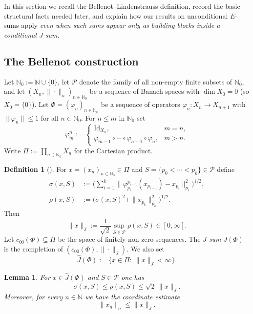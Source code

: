 \documentclass[reqno]{amsart}
\theoremstyle{plain}
\newtheorem{lemma}[theorem]{Lemma}
\theoremstyle{definition}
\newtheorem{definition}[theorem]{Definition}
\theoremstyle{remark}
\newcommand{\N}{\mathbb{N}}
\renewcommand{\le}{\leqslant}
\begin{document}
In this section we recall the Bellenot--Lindenstrauss definition, record the
basic structural facts needed later, and explain how our results on unconditional
$E$-sums apply \emph{even when such sums appear only as building blocks inside a
conditional $J$-sum}.  

\subsection{The Bellenot construction}\label{subsec:Jsum-def}

Let $\N_0:=\N\cup\{0\}$, let $\mathcal{P}$ denote the family of all non-empty
finite subsets of $\N_0$, and let $(X_n,\|\cdot\|_n)_{n\in\N_0}$ be a sequence of
Banach spaces with $\dim X_0=0$ (so $X_0=\{0\}$).
Let $\Phi=(\varphi_n)_{n\in\N_0}$ be a sequence of operators
$\varphi_n\colon X_n\to X_{n+1}$ with $\|\varphi_n\|\le 1$ for all $n\in\N_0$.
For $n\le m$ in $\N_0$ set
\[
\varphi_m^n :=
\begin{cases}
\mathrm{Id}_{X_n}, & m=n,\\
\varphi_{m-1}\circ\cdots\circ \varphi_{n+1}\circ \varphi_n, & m>n.
\end{cases}
\]
Write $\Pi:=\prod_{n\in\N_0} X_n$ for the Cartesian product.

\begin{definition}[{\cite[Def.\ 2.1]{Bellenot1982}}]\label{def:J-norm}
For $x=(x_n)_{n\in\N_0}\in\Pi$ and $S=\{p_0<\cdots<p_k\}\in\mathcal{P}$ define
\begin{align}
\sigma(x,S)
 &:= \Big( \sum_{i=1}^k \big\|\varphi_{p_i}^{p_{i-1}}(x_{p_{i-1}})-x_{p_i}\big\|_{p_i}^2 \Big)^{1/2},\label{eq:sigma}\\
\rho(x,S)
 &:= \Big( \sigma(x,S)^2 + \|x_{p_k}\|_{p_k}^2 \Big)^{1/2}.\label{eq:rho}
\end{align}
Then
\begin{equation}\label{eq:Jnorm}
\|x\|_{J}:=\frac{1}{\sqrt{2}}\sup_{S\in\mathcal{P}} \rho(x,S)\in[0,\infty].
\end{equation}
Let $c_{00}(\Phi)\subseteq\Pi$ be the space of finitely non-zero sequences.
The \emph{$J$-sum} $J(\Phi)$ is the completion of $(c_{00}(\Phi),\|\cdot\|_{J})$.
We also set
\[
\widehat{J}(\Phi):=\{x\in\Pi:\ \|x\|_{J}<\infty\}.
\]
\end{definition}

\begin{lemma}\label{lem:J-elementary}
For $x\in \widehat{J}(\Phi)$ and $S\in\mathcal{P}$ one has
\[
\sigma(x,S)\le \rho(x,S)\le \sqrt{2}\,\|x\|_{J}.
\]
Moreover, for every $n\in\N$ we have the coordinate estimate
\begin{equation}\label{eq:coord-contract}
\|x_n\|_n \le \|x\|_{J}.
\end{equation}
\end{lemma}
\end{document}
